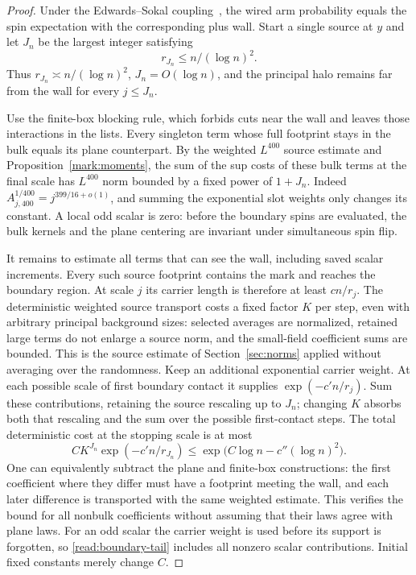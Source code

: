 \begin{proof}
Under the Edwards--Sokal coupling~\cite{EdwardsSokal1988}, the wired
arm probability equals the spin expectation with the corresponding
plus wall.  Start a single source at $y$ and let $J_n$ be the largest
integer satisfying
\begin{equation}
 r_{J_n}\le n/(\log n)^2.
 \label{read:arm-stop}
\end{equation}
Thus $r_{J_n}\asymp n/(\log n)^2$, $J_n=O(\log n)$, and the principal
halo remains far from the wall for every $j\le J_n$.

Use the finite-box blocking rule, which forbids cuts near the wall
and leaves those interactions in the lists.  Every singleton term
whose full footprint stays in the bulk equals its plane counterpart.
By the weighted $L^{400}$ source estimate and
Proposition~\ref{mark:moments}, the sum of the sup costs of these
bulk terms at the final scale has $L^{400}$ norm bounded by a fixed
power of $1+J_n$.  Indeed
$A_{j,400}^{1/400}=j^{399/16+o(1)}$, and summing the exponential
slot weights only changes its constant.  A local odd scalar is zero:
before the boundary spins are evaluated, the bulk kernels and the
plane centering are invariant under simultaneous spin flip.

It remains to estimate all terms that can see the wall, including
saved scalar increments.  Every such source footprint contains the
mark and reaches the boundary region.  At scale $j$ its carrier length
is therefore at least $c n/r_j$.  The deterministic weighted source
transport costs a fixed factor $K$ per step, even with arbitrary
principal background sizes: selected averages are normalized, retained
large terms do not enlarge a source norm, and the small-field
coefficient sums are bounded.  This is the source estimate of
Section~\ref{sec:norms} applied without averaging over the randomness.
Keep an additional exponential carrier weight.  At each possible
scale of first boundary contact it supplies
$\exp(-c'n/r_j)$.  Sum these contributions, retaining the source
rescaling up to $J_n$; changing $K$ absorbs both that rescaling and
the sum over the possible first-contact steps.  The total deterministic
cost at the stopping scale is at most
\begin{equation}
 C K^{J_n}\exp(-c'n/r_{J_n})
 \le \exp\bigl(C\log n-c''(\log n)^2\bigr).
 \label{read:boundary-tail}
\end{equation}
One can equivalently subtract the plane and finite-box constructions:
the first coefficient where they differ must have a footprint meeting
the wall, and each later difference is transported with the same
weighted estimate.  This verifies the bound for all nonbulk
coefficients without assuming that their laws agree with plane laws.
For an odd scalar the carrier weight is used before its support is
forgotten, so \eqref{read:boundary-tail} includes all nonzero scalar
contributions.  Initial fixed constants merely change $C$.


\end{proof}
